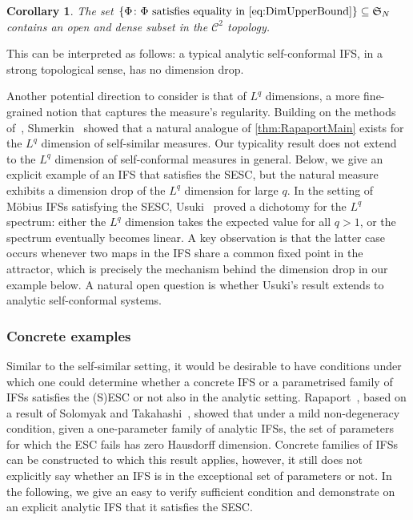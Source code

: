 \documentclass[11pt,a4paper]{article}
\def\cref#1{\ref{#1}}%
\newtheorem{corollary}[theorem]{Corollary}
\theoremstyle{definition}
\theoremstyle{remark}
\newcommand{\0}{\mathbf{0}}
\numberwithin{equation}{section}
\begin{document}
\begin{corollary}\label{cor:dim}
  The set $\{\Phi \colon \Phi \text{ satisfies equality in \cref{eq:DimUpperBound}}\}\subseteq
  \mathfrak{S}_N$ contains an open and dense subset in the $\mathcal{C}^2$ topology.
\end{corollary}
This can be interpreted as follows: a typical analytic self-conformal IFS, in a strong topological
sense, has no dimension drop.

Another potential direction to consider is that of $L^q$ dimensions, a more fine-grained notion that
captures the measure's regularity.  Building on the methods of~\cite{Hochman_SelfSimESC_Annals},
Shmerkin~\cite{Shmerkin_LqSelfSim_Annals} showed that a natural analogue of \cref{thm:RapaportMain}
exists for the $L^q$ dimension of self-similar measures. 
Our typicality result does not extend to the $L^q$ dimension of self-conformal measures in general.
Below, we give an explicit example of an IFS that satisfies the SESC, but the natural measure
exhibits a dimension drop of the $L^q$ dimension for large $q$.
In the setting of M\"obius IFSs satisfying the SESC,
Usuki~\cite{Usuki_LqMobius25arXiv} proved a dichotomy for the $L^q$ spectrum: either
the $L^q$ dimension takes the expected value for all $q>1$, or the spectrum eventually becomes
linear. A key observation is that the latter case occurs whenever two maps in the IFS share a
common fixed point in the attractor, which is precisely the mechanism behind the dimension drop in
our example below.
A natural open question is whether Usuki's result extends to analytic self-conformal
systems.


\subsubsection{Concrete examples}\label{sec:examples}
Similar to the self-similar setting, it would be desirable to have conditions under which one
could determine whether a concrete IFS or a parametrised family of IFSs satisfies the (S)ESC or not
also in the analytic setting. Rapaport~\cite[Corollary 1.4]{Rapaport_SelfConfESC25arXiv}, based on a
result of Solomyak and Takahashi~\cite{SolomyakTakahashi_IMRN21}, showed that under a mild
non-degeneracy condition, given a one-parameter family of analytic IFSs, the set of parameters for
which the ESC fails has zero Hausdorff dimension. Concrete families of IFSs can be constructed to
which this result applies, however, it still does not explicitly say whether an IFS is in the
exceptional set of parameters or not. 
In the following, we give an easy to verify sufficient condition and demonstrate on
an explicit analytic IFS that it satisfies the SESC. 
\end{document}
